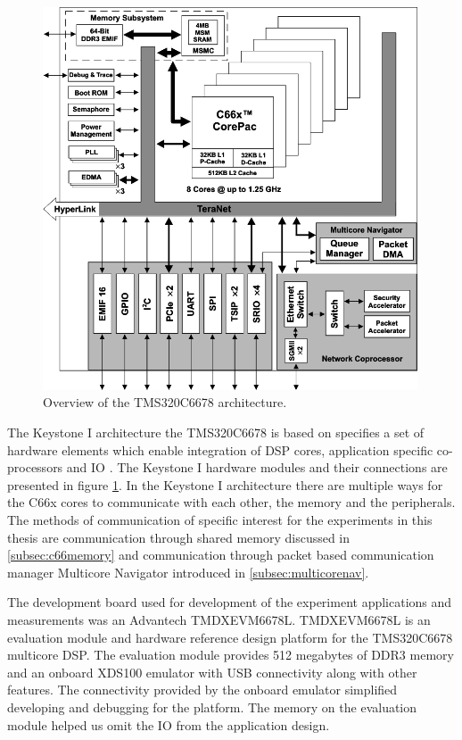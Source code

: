\begin{figure}[h!] \label{arch_overview} \begin{center}
    \includegraphics[width=0.99\textwidth]{images/fbd_SPRS691e.png}
    \caption{Overview of the TMS320C6678 architecture.} \end{center}
\end{figure}

The Keystone I architecture the TMS320C6678 is based on specifies a set of
hardware elements which enable integration of DSP cores, application specific
co-processors and IO \cite{tmsdatasheet}. The Keystone I hardware modules and
their connections are presented in figure \ref{arch_overview}. In the Keystone
I architecture there are multiple ways for the C66x cores to communicate with
each other, the memory and the peripherals. The methods of communication of
specific interest for the experiments in this thesis are communication through
shared memory discussed in \ref{subsec:c66memory} and communication through
packet based communication manager Multicore Navigator introduced in
\ref{subsec:multicorenav}.

The development board used for development of the experiment applications and
measurements was an Advantech TMDXEVM6678L. TMDXEVM6678L is an evaluation
module and hardware reference design platform for the TMS320C6678 multicore
DSP. The evaluation module provides 512 megabytes of DDR3 memory and an onboard
XDS100 emulator with USB connectivity along with other features. \cite{evmref}
The connectivity provided by the onboard emulator simplified developing and
debugging for the platform. The memory on the evaluation module helped us omit
the IO from the application design.

